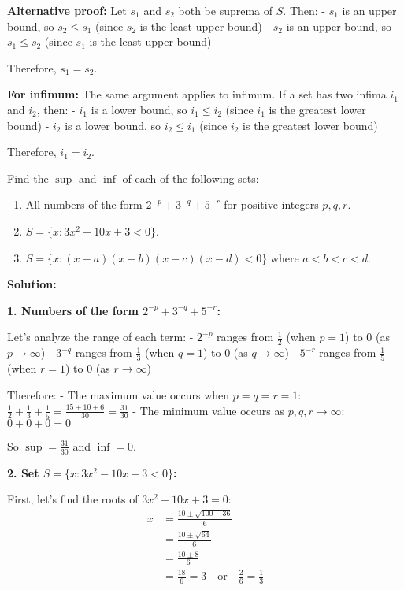 \textbf{Alternative proof:}
Let $s_1$ and $s_2$ both be suprema of $S$. Then:
- $s_1$ is an upper bound, so $s_2 \leq s_1$ (since $s_2$ is the least upper bound)
- $s_2$ is an upper bound, so $s_1 \leq s_2$ (since $s_1$ is the least upper bound)

Therefore, $s_1 = s_2$.

\textbf{For infimum:}
The same argument applies to infimum. If a set has two infima $i_1$ and $i_2$, then:
- $i_1$ is a lower bound, so $i_1 \leq i_2$ (since $i_1$ is the greatest lower bound)
- $i_2$ is a lower bound, so $i_2 \leq i_1$ (since $i_2$ is the greatest lower bound)

Therefore, $i_1 = i_2$.

\begin{problembox}
Find the $\sup$ and $\inf$ of each of the following sets:
\begin{enumerate}[label=(\alph*)]
\item All numbers of the form $2^{-p} + 3^{-q} + 5^{-r}$ for positive integers $p, q, r$.
\item $S = \{x : 3x^2 - 10x + 3 < 0\}$.
\item $S = \{x : (x - a)(x - b)(x - c)(x - d) < 0\}$ where $a < b < c < d$.
\end{enumerate}
\end{problembox}

\textbf{Solution:}

\textbf{1. Numbers of the form $2^{-p} + 3^{-q} + 5^{-r}$:}

Let's analyze the range of each term:
- $2^{-p}$ ranges from $\frac{1}{2}$ (when $p = 1$) to $0$ (as $p \to \infty$)
- $3^{-q}$ ranges from $\frac{1}{3}$ (when $q = 1$) to $0$ (as $q \to \infty$)
- $5^{-r}$ ranges from $\frac{1}{5}$ (when $r = 1$) to $0$ (as $r \to \infty$)

Therefore:
- The maximum value occurs when $p = q = r = 1$: $\frac{1}{2} + \frac{1}{3} + \frac{1}{5} = \frac{15 + 10 + 6}{30} = \frac{31}{30}$
- The minimum value occurs as $p, q, r \to \infty$: $0 + 0 + 0 = 0$

So $\sup = \frac{31}{30}$ and $\inf = 0$.

\textbf{2. Set $S = \{x : 3x^2 - 10x + 3 < 0\}$:}

First, let's find the roots of $3x^2 - 10x + 3 = 0$:
\begin{align*}
x &= \frac{10 \pm \sqrt{100 - 36}}{6} \\
&= \frac{10 \pm \sqrt{64}}{6} \\
&= \frac{10 \pm 8}{6} \\
&= \frac{18}{6} = 3 \quad \text{or} \quad \frac{2}{6} = \frac{1}{3}
\end{align*}

